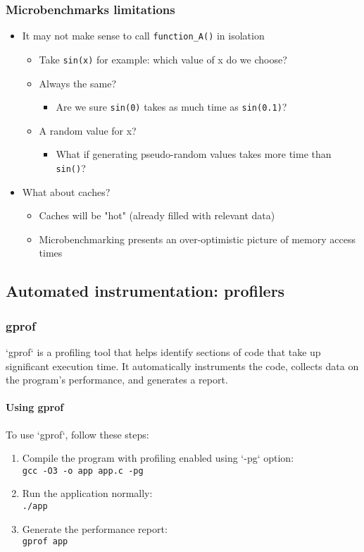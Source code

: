 \documentclass[12pt]{article}
\begin{document}
\subsubsection{Microbenchmarks limitations}

\begin{itemize}
    \item It may not make sense to call \texttt{function\_A()} in isolation
    \begin{itemize}
        \item Take \texttt{sin(x)} for example: which value of x do we choose?
        \item Always the same?
        \begin{itemize}
            \item Are we sure \texttt{sin(0)} takes as much time as \texttt{sin(0.1)}?
        \end{itemize}
        \item A random value for x?
        \begin{itemize}
            \item What if generating pseudo-random values takes more time than \texttt{sin()}?
        \end{itemize}
    \end{itemize}
    \item What about caches?
    \begin{itemize}
        \item Caches will be "hot" (already filled with relevant data)
        \item Microbenchmarking presents an over-optimistic picture of memory access times
    \end{itemize}
\end{itemize}


\subsection{Automated instrumentation: profilers}

\subsubsection{gprof}
`gprof` is a profiling tool that helps identify sections of code that take up significant execution time. It automatically instruments the code, collects data on the program's performance, and generates a report.

\paragraph{Using gprof}
To use `gprof`, follow these steps:
\begin{enumerate}
    \item Compile the program with profiling enabled using `-pg` option:\\
    \texttt{gcc -O3 -o app app.c -pg}
    \item Run the application normally:\\
    \texttt{./app}
    \item Generate the performance report:\\
    \texttt{gprof app}
\end{enumerate}
\end{document}
